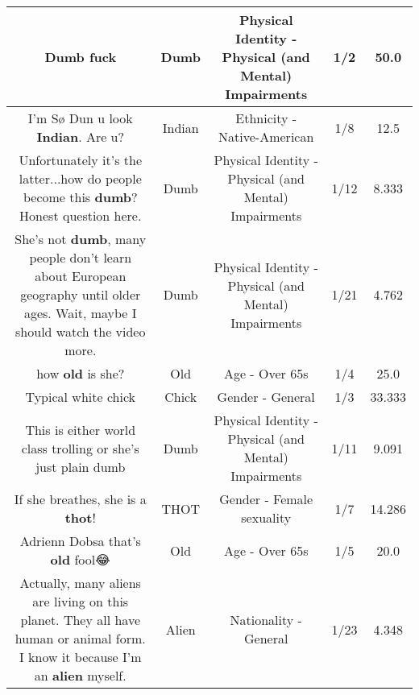 \documentclass[11pt]{article}
\newlength\mylength
\begin{document}
\begin{center}
\begin{longtable}{|C{.65\mylength}|C{.30\mylength}|C{.12\mylength}|C{.12\mylength}|C{.12\mylength}|}
  \small Dumb fuck\normalsize   & Dumb & Physical Identity - Physical (and Mental) Impairments & 1/2 & 50.0 \\  \hline
  \small I'm Sø Dun u look \textbf{Indian}. Are u?\normalsize   & Indian & Ethnicity - Native-American & 1/8 & 12.5 \\  \hline
  \small Unfortunately it's the latter...how do people become this \textbf{dumb}? Honest question here.\normalsize   & Dumb & Physical Identity - Physical (and Mental) Impairments & 1/12 & 8.333 \\  \hline
  \small She's not \textbf{dumb}, many people don't learn about European geography until older ages. Wait, maybe I should watch the video more.\normalsize   & Dumb & Physical Identity - Physical (and Mental) Impairments & 1/21 & 4.762 \\  \hline
  \small how \textbf{old} is she?\normalsize   & Old & Age - Over 65s & 1/4 & 25.0 \\  \hline
  \small Typical white chick\normalsize   & Chick & Gender - General & 1/3 & 33.333 \\  \hline
  \small This is either world class trolling or she's just plain dumb\normalsize   & Dumb & Physical Identity - Physical (and Mental) Impairments & 1/11 & 9.091 \\  \hline
  \small If she breathes, she is a \textbf{thot}!\normalsize   & THOT & Gender - Female sexuality & 1/7 & 14.286 \\  \hline
  \small Adrienn Dobsa that's \textbf{old} fool😂\normalsize   & Old & Age - Over 65s & 1/5 & 20.0 \\  \hline
  \small Actually, many aliens are living on this planet. They all have human or animal form. I know it because I'm an \textbf{alien} myself.\normalsize   & Alien & Nationality - General & 1/23 & 4.348 \\  \hline

\end{longtable}
\end{center}
\end{document}
